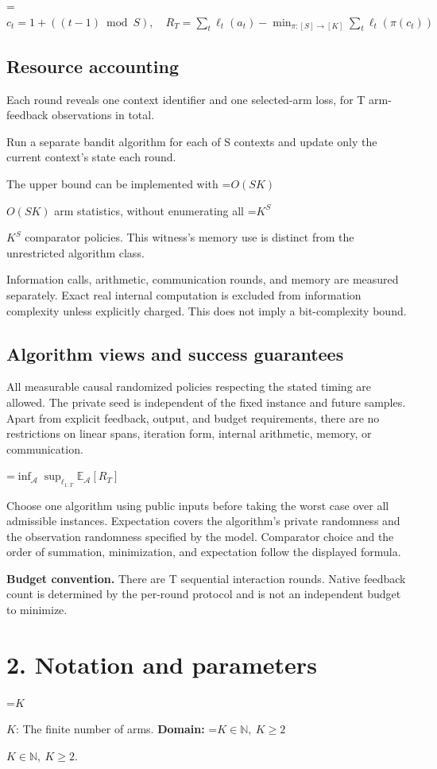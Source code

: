 \documentclass[10pt,a4paper]{article}
\newcommand{\AtlasMath}[1]{\par\begingroup\centering\setbox0=\hbox{$\displaystyle #1$}\ifdim\wd0>1.4\linewidth\typeout{ATLAS WIDE FORMULA: \the\wd0}\fi\ifdim\wd0>\linewidth\resizebox{\linewidth}{!}{\box0}\else\box0\fi\par\endgroup}
\newcommand{\AtlasInlineMath}[1]{\begingroup\setbox0=\hbox{$#1$}\ifdim\wd0>.4\linewidth\endgroup\AtlasMath{#1}\else\endgroup$#1$\fi}
\begin{document}
\AtlasMath{c_t=1+((t-1)\bmod S),\quad R_T=\sum_t\ell_t(a_t)-\min_{\pi:[S]\to[K]}\sum_t\ell_t(\pi(c_t))}


\subsection{Resource accounting}
Each round reveals one context identifier and one selected-arm loss, for T arm-feedback observations in total.

Run a separate bandit algorithm for each of S contexts and update only the current context's state each round.

The upper bound can be implemented with \AtlasInlineMath{O(SK)} arm statistics, without enumerating all \AtlasInlineMath{K^S} comparator policies. This witness's memory use is distinct from the unrestricted algorithm class.

Information calls, arithmetic, communication rounds, and memory are measured separately. Exact real internal computation is excluded from information complexity unless explicitly charged. This does not imply a bit-complexity bound.

\subsection{Algorithm views and success guarantees}
All measurable causal randomized policies respecting the stated timing are allowed. The private seed is independent of the fixed instance and future samples. Apart from explicit feedback, output, and budget requirements, there are no restrictions on linear spans, iteration form, internal arithmetic, memory, or communication.


\AtlasMath{\inf_{\mathcal{A}}\sup_{\ell_{1:T}}\mathbb{E}_{\mathcal{A}}[R_T]}


Choose one algorithm using public inputs before taking the worst case over all admissible instances. Expectation covers the algorithm's private randomness and the observation randomness specified by the model. Comparator choice and the order of summation, minimization, and expectation follow the displayed formula.

\textbf{Budget convention.} There are T sequential interaction rounds. Native feedback count is determined by the per-round protocol and is not an independent budget to minimize.

\section{2. Notation and parameters}
\AtlasInlineMath{K}: The finite number of arms. \textbf{Domain:} \AtlasInlineMath{K\in\mathbb N,\ K\ge2}.
\end{document}
